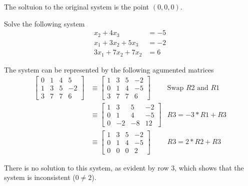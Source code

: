 \documentclass{../mathhomework}
\begin{document}
\begin{problem}[1.1\#8]
\begin{solution}
                The soltuion to the original system is the point $(0,0,0)$.
    \end{solution}
\end{problem}

\pagebreak
\begin{problem}[1.1\#11]
    Solve the following system
    \begin{align*}
        x_2 + 4x_3 & = -5 \\
        x_1 + 3x_2 + 5x_3 &= -2 \\
        3x_1 + 7x_2 + 7x_2 &= 6
    \end{align*}

    \begin{solution}
        The system can be represented by the following agumented matrices
        \begin{align*}
            \begin{bmatrix}
                0 & 1 & 4 & 5 \\
                1 & 3 & 5 & -2 \\
                3 & 7 & 7 & 6
            \end{bmatrix}
            & \equiv
            \begin{bmatrix}
                1 & 3 & 5 & -2 \\
                0 & 1 & 4 & -5 \\
                3 & 7 & 7 & 6
            \end{bmatrix}
            & \text{Swap $R2$ and $R1$} \\ & \equiv
            \begin{bmatrix}
                1 & 3 & 5 & -2 \\
                0 & 1 & 4 & -5 \\
                0 & -2 & -8 & 12
            \end{bmatrix}
            & R3 = -3 * R1 + R3 \\ & \equiv
            \begin{bmatrix}
                1 & 3 & 5 & -2 \\
                0 & 1 & 4 & -5 \\
                0 & 0 & 0 & 2
            \end{bmatrix}
            & R3 = 2 * R2 + R3
        \end{align*}
    
        There is no solution to this system, as evident by row 3, which shows that the system is inconsistent ($0\neq2$).
    \end{solution}
\end{problem}
\end{document}
